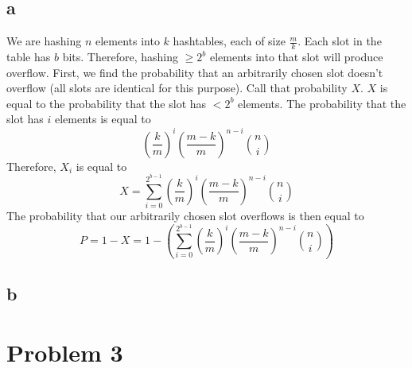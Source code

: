\documentclass{article}
\begin{document}
\subsection*{a}
We are hashing $n$ elements into $k$ hashtables, each of size $\frac{m}{k}$. Each slot in the table has $b$ bits. Therefore, hashing $\geq 2^b$ elements into that slot will produce overflow.  First, we find the probability that an arbitrarily chosen slot doesn't overflow (all slots are identical for this purpose). Call that probability $X$. $X$ is equal to the probability that the slot has $< 2^b$ elements. The probability that the slot has $i$ elements is equal to 
$$(\frac{k}{m})^i (\frac{m-k}{m})^{n-i} {n \choose i}$$
Therefore, $X_i$ is equal to 
$$X = \sum\limits_{i=0}^{2^{b-1}} (\frac{k}{m})^i (\frac{m-k}{m})^{n-i} {n \choose i}$$
The probability that our arbitrarily chosen slot overflows is then equal to 
$$P = 1-X = 1-(\sum\limits_{i=0}^{2^{b-1}} (\frac{k}{m})^i (\frac{m-k}{m})^{n-i} {n \choose i})$$
\subsection*{b}

\section*{Problem 3}
\end{document}
